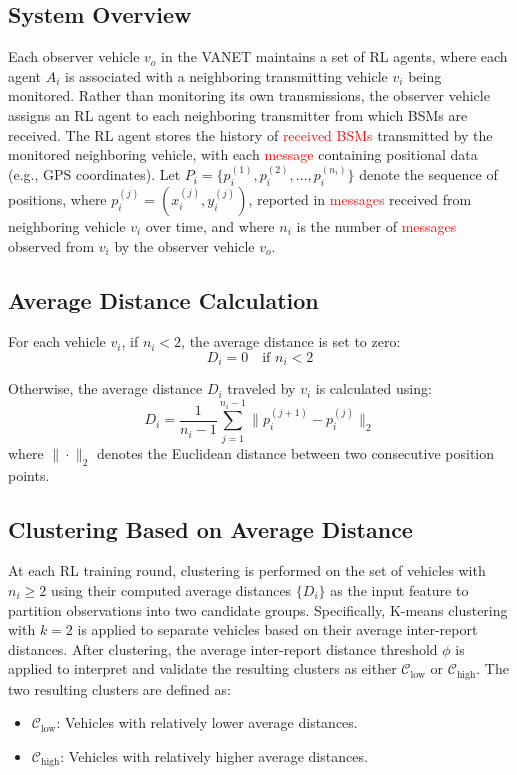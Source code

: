 \documentclass[conference]{IEEEtran}
\begin{document}
\subsection{System Overview}


Each observer vehicle $v_o$ in the VANET maintains a set of RL agents, where each agent $A_i$ is associated with a neighboring transmitting vehicle $v_i$ being monitored. Rather than monitoring its own transmissions, the observer vehicle assigns an RL agent to each neighboring transmitter from which BSMs are received. The RL agent stores the history of \textcolor{red}{received BSMs} transmitted by the monitored neighboring vehicle, with each \textcolor{red}{message} containing positional data (e.g., GPS coordinates). Let $P_i = \{p_{i}^{(1)}, p_{i}^{(2)}, \dots, p_{i}^{(n_i)}\}$ denote the sequence of positions, where $p_{i}^{(j)} = (x_{i}^{(j)}, y_{i}^{(j)})$, reported in \textcolor{red}{messages} received from neighboring vehicle $v_i$ over time, and where $n_i$ is the number of \textcolor{red}{messages} observed from $v_i$ by the observer vehicle $v_o$.


\subsection{Average Distance Calculation}

For each vehicle $v_i$, if $n_i < 2$, the average distance is set to zero:
\[
D_i = 0 \quad \text{if } n_i < 2
\]

Otherwise, the average distance $D_i$ traveled by $v_i$ is calculated using:
\[
D_i = \frac{1}{n_i - 1} \sum_{j=1}^{n_i - 1} \|p_{i}^{(j+1)} - p_{i}^{(j)}\|_2
\]
where $\| \cdot \|_2$ denotes the Euclidean distance between two consecutive position points.

\subsection{Clustering Based on Average Distance}


At each RL training round, clustering is performed on the set of vehicles with $n_i \geq 2$ using their computed average distances $\{D_i\}$ as the input feature to partition observations into two candidate groups. Specifically, K-means clustering with $k=2$ is applied to separate vehicles based on their average inter-report distances. After clustering, the average inter-report distance threshold $\phi$ is applied to interpret and validate the resulting clusters as either $\mathcal{C}_{\text{low}}$ or $\mathcal{C}_{\text{high}}$. The two resulting clusters are defined as:
\begin{itemize} 
    \item $\mathcal{C}_{\text{low}}$: Vehicles with relatively lower average distances.
    \item $\mathcal{C}_{\text{high}}$: Vehicles with relatively higher average distances.
\end{itemize}
\end{document}
